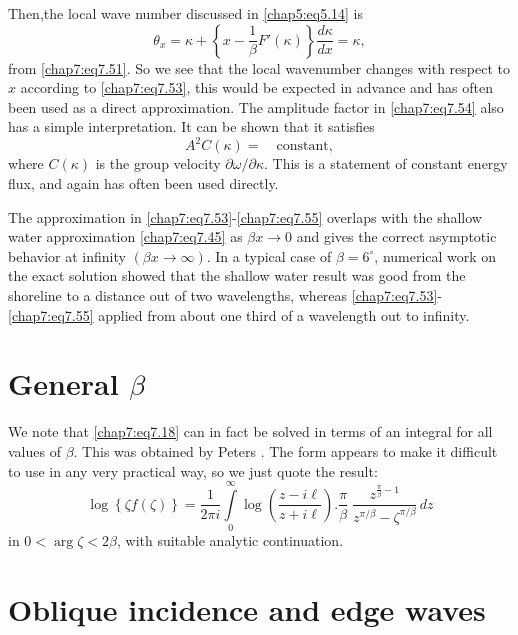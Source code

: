 {{Then,\pageoriginale the local wave number discussed in \eqref{chap5:eq5.14} is
$$
\theta_x=\kappa +\left\{x-\frac{1}{\beta}F'(\kappa)\right\}\frac{d\kappa} {dx}=\kappa,
$$
from \eqref{chap7:eq7.51}. So we see that the local wavenumber changes with respect to $x$ according to \eqref{chap7:eq7.53}, this would be expected in advance and has often been used as a direct approximation. The amplitude factor in \eqref{chap7:eq7.54} also has a simple interpretation. It can be shown that it satisfies
\begin{equation}
A^2C(\kappa)=\quad\text{constant},\tag{7.56}\label{chap7:eq7.56}
\end{equation}
where $C(\kappa)$ is the group velocity $\partial\omega/\partial\kappa$. This is a statement of constant energy flux, and again has often been used directly. 

The approximation in \eqref{chap7:eq7.53}-\eqref{chap7:eq7.55} overlaps with the shallow water approximation \eqref{chap7:eq7.45} as $\beta x\to 0$ and gives the correct asymptotic behavior at infinity $(\beta x\to\infty)$. In a typical case of $\beta =6^\circ$, numerical work on the exact solution showed that the shallow water result was good from the shoreline to a distance out of two wavelengths, whereas \eqref{chap7:eq7.53}-\eqref{chap7:eq7.55} applied from about one third of a wavelength out to infinity.

\section{General $\beta$}\label{chap7:sec7.4}

We note that \eqref{chap7:eq7.18} can in fact be solved in terms of an integral for all values of $\beta$. This was obtained by Peters \cite{key13}. The form appears to make it difficult to use in any very practical way, so we just quote the result:
\begin{equation}
\log\left\{\zeta f(\zeta)\right\}=\frac{1}{2\pi i}\int\limits_0^\infty\log\left( \frac{z-i\ell}{z+i\ell}\right).\frac{\pi}{\beta}\;\frac{z^{\frac{\pi}{\beta}-1}} {z^{\pi/\beta}-\zeta^{\pi/\beta}}\,dz\tag{7.57}\label{chap7:eq7.57}
\end{equation}\pageoriginale
in $0<\arg\zeta <2\beta$, with suitable analytic continuation.

\section{Oblique incidence and edge waves}\label{chap7:sec7.5}

}}
